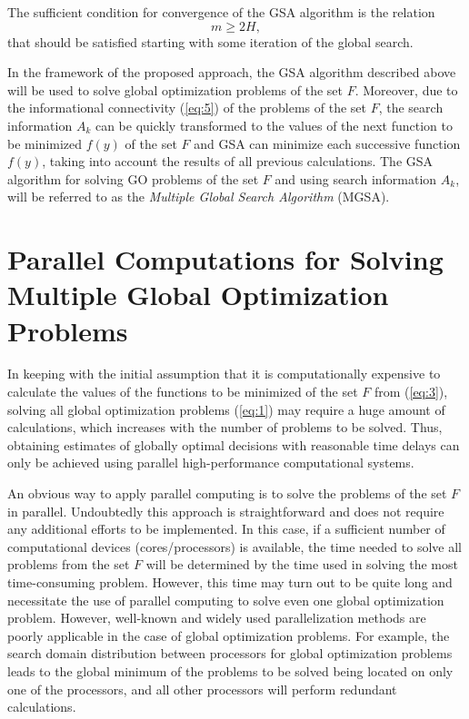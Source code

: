 \documentclass[review]{elsarticle}
\begin{document}
The sufficient condition for convergence of the GSA algorithm is the relation
\begin{equation}\label{eq:24}
m \geq 2H,
\end{equation}
that should be satisfied starting with some iteration of the global search. 

In the framework of the proposed approach, the GSA algorithm described above will be used to solve global optimization problems of the set $F$. Moreover, due to the informational connectivity (\ref{eq:5}) of the problems of the set $F$, the search information $A_k$ can be quickly transformed to the values of the next function to be minimized $f(y)$ of the set $F$ and GSA can minimize each successive function $f(y)$, taking into account the results of all previous calculations. The GSA algorithm for solving GO problems of the set $F$ and using search information $A_k$, will be referred to as the \textit{Multiple Global Search Algorithm} (MGSA).


\section{Parallel Computations for Solving Multiple Global Optimization Problems}\label{sec:4}

In keeping with the initial assumption that it is computationally expensive to calculate the values of the functions to be minimized of the set $F$ from (\ref{eq:3}), solving all global optimization problems (\ref{eq:1}) may require a huge amount of calculations, which increases with the number of problems to be solved. Thus, obtaining estimates of globally optimal decisions with reasonable time delays can only be achieved using parallel high-performance computational systems. 

An obvious way to apply parallel computing is to solve the problems of the set $F$ in parallel. Undoubtedly this approach is straightforward and does not require any additional efforts to be  implemented. In this case, if a sufficient number of computational devices ({cores/processors}) is available, the time needed to solve all problems from the set $F$ will be determined by the time used in solving the most time-consuming problem. However, this time may turn out to be quite long and necessitate the use of parallel computing to solve even one global optimization problem. However, well-known and widely used parallelization methods are poorly applicable in the case of global optimization problems. For example, the search domain distribution between processors for global optimization problems leads to the global minimum of the problems to be solved being located on only one of the processors, and all other processors will perform redundant calculations.
\end{document}
